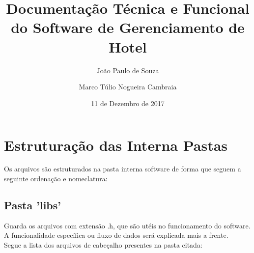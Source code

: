 \documentclass{article}
\title{Documentação Técnica e Funcional do Software de Gerenciamento de Hotel}
\date{11 de Dezembro de 2017}
\author{João Paulo de Souza \and Marco Túlio Nogueira Cambraia}
\begin{document}
  \maketitle
  \newpage
  \tableofcontents %
  \newpage

  \section{Estruturação das Interna Pastas}
  	Os arquivos são estruturados na pasta interna software de forma que seguem a seguinte ordenação e nomeclatura:\\
  	\subsection{Pasta 'libs'} Guarda os arquivos com extensão .h, que são utéis no funcionamento do software. A funcionalidade específica ou fluxo de dados será explicada mais a frente.\\
  	Segue a lista dos arquivos de cabeçalho presentes na pasta citada: \\
\end{document}
